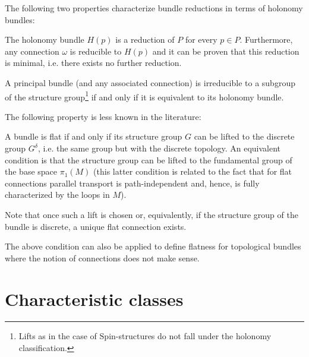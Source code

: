     The following two properties characterize bundle reductions in terms of holonomy bundles:
    \begin{property}
        The holonomy bundle $H(p)$ is a reduction of $P$ for every $p\in P$. Furthermore, any connection $\omega$ is reducible to $H(p)$ and it can be proven that this reduction is minimal, i.e. there exists no further reduction.
    \end{property}
    \begin{result}\label{bundle:reducible_holonomy}
        A principal bundle (and any associated connection) is irreducible to a subgroup of the structure group\footnote{Lifts as in the case of $\mathrm{Spin}$-structures do not fall under the holonomy classification.} if and only if it is equivalent to its holonomy bundle.
    \end{result}

    The following property is less known in the literature:
    \begin{property}\label{bundle:flat_connection_cohomology}
        A bundle is flat if and only if its structure group $G$ can be lifted to the discrete group $G^\delta$, i.e. the same group but with the discrete topology. An equivalent condition is that the structure group can be lifted to the fundamental group of the base space $\pi_1(M)$ (this latter condition is related to the fact that for flat connections parallel transport is path-independent and, hence, is fully characterized by the loops in $M$).

        Note that once such a lift is chosen or, equivalently, if the structure group of the bundle is discrete, a unique flat connection exists.
    \end{property}
    \begin{remark}
        The above condition can also be applied to define flatness for topological bundles where the notion of connections does not make sense.
    \end{remark}

\section{Characteristic classes}

